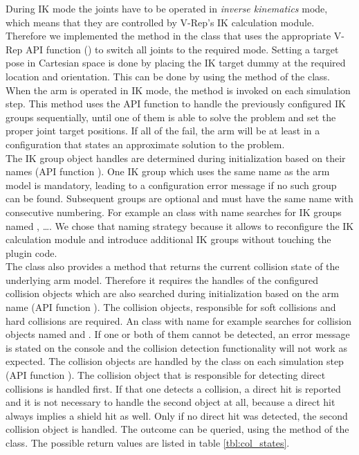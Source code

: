 During IK mode the joints have to be operated in \emph{inverse kinematics} mode, which means that they are controlled by V-Rep's IK calculation module. Therefore we implemented the method  in the  class that uses the appropriate V-Rep API function () to switch all joints to the required mode. Setting a target pose in Cartesian space is done by placing the IK target dummy at the required location and orientation. This can be done by using the method  of the  class. When the arm is operated in IK mode, the method  is invoked on each simulation step. This method uses the API function  to handle the previously configured IK groups sequentially, until one of them is able to solve the problem and set the proper joint target positions. If all of the fail, the arm will be at least in a configuration that states an approximate solution to the problem. \\

The IK group object handles are determined during initialization based on their names (API function ). One IK group which uses the same name as the arm model is mandatory, leading to a configuration error message if no such group can be found. Subsequent groups are optional and must have the same name with consecutive numbering. For example an  class with name  searches for IK groups named , \ldots. We chose that naming strategy because it allows to reconfigure the IK calculation module and introduce additional IK groups without touching the plugin code. \\

The  class also provides a method that returns the current collision state of the underlying arm model. Therefore it requires the handles of the configured collision objects which are also searched during initialization based on the arm name (API function ). The collision objects, responsible for soft collisions and hard collisions are required. An  class with name  for example searches for collision objects named  and . If one or both of them cannot be detected, an error message is stated on the console and the collision detection functionality will not work as expected. The collision objects are handled by the  class on each simulation step (API function ). The collision object that is responsible for detecting direct collisions is handled first. If that one detects a collision, a direct hit is reported and it is not necessary to handle the second object at all, because a direct hit always implies a shield hit as well. Only if no direct hit was detected, the second collision object is handled. The outcome can be queried, using the method  of the  class. The possible return values are listed in table \ref{tbl:col_states}. \\

